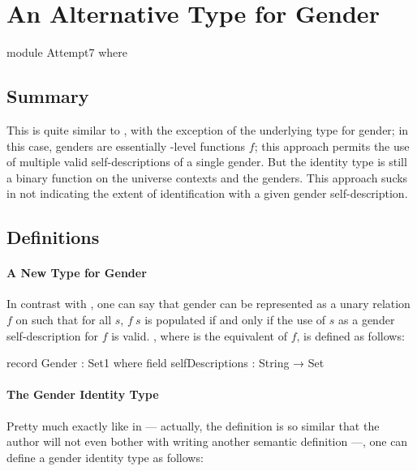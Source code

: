 \documentclass{article}
\theoremstyle{remark}
\begin{document}
\section{An Alternative Type for Gender}

\begin{code}
module Attempt7 where
\end{code}

\subsection{Summary}
This  is quite similar to \hyperref[sec:gender6]{}, with the exception of the underlying type for gender; in this case, genders are essentially -level functions \(f\); this approach permits the use of multiple valid self-descriptions of a single gender.  But the identity type is still a binary function on the universe contexts and the genders.  This approach sucks in not indicating the extent of identification with a given gender self-description.

\subsection{Definitions}
\paragraph{A New Type for Gender}
In contrast with , one can say that gender can be represented as a unary relation \(f\) on  such that for all \(s\), \(f\ s\) is populated if and only if the use of \(s\) as a gender self-description for \(f\) is valid.  , where  is the equivalent of \(f\), is defined as follows:

\begin{code}
  record Gender : Set1 where
    field
      selfDescriptions : String → Set
\end{code}

\paragraph{The Gender Identity Type}
Pretty much exactly like in  --- actually, the definition is so similar that the author will not even bother with writing another semantic definition ---, one can define a gender identity type  as follows:
\end{document}
